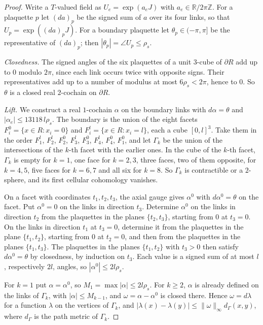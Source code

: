 \documentclass[11pt]{amsart}
\theoremstyle{definition}
\theoremstyle{remark}
\numberwithin{equation}{section}
\newcommand{\R}{\mathbb{R}}
\newcommand{\Z}{\mathbb{Z}}
\begin{document}
\begin{proof}
Write a $T$-valued field as $U_e=\exp(a_eJ)$ with $a_e\in\R/2\pi\Z$. For a
plaquette $p$ let $(da)_p$ be the signed sum of $a$ over its four links, so
that $U_p=\exp((da)_pJ)$. For a boundary plaquette let $\theta_p\in(-\pi,
\pi]$ be the representative of $(da)_p$; then $|\theta_p|=\angle U_p\le
\rho_s$.

\emph{Closedness.} The signed angles of the six plaquettes of a unit
$3$-cube of $\partial R$ add up to $0$ modulo $2\pi$, since each link occurs
twice with opposite signs. Their representatives add up to a number of
modulus at most $6\rho_s<2\pi$, hence to $0$. So $\theta$ is a closed real
$2$-cochain on $\partial R$.

\emph{Lift.} We construct a real $1$-cochain $\alpha$ on the boundary links
with $d\alpha=\theta$ and $|\alpha_e|\le13118\,l\rho_s$. The boundary is the
union of the eight facets $F_i^0=\{x\in R:x_i=0\}$ and $F_i^l=\{x\in R:x_i=
l\}$, each a cube $[0,l]^3$. Take them in the order $F_1^l$, $F_2^l$,
$F_2^0$, $F_3^l$, $F_3^0$, $F_4^l$, $F_4^0$, $F_1^0$, and let $\Gamma_k$ be
the union of the intersections of the $k$-th facet with the earlier ones.
In the cube of the $k$-th facet, $\Gamma_k$ is empty for $k=1$, one face for
$k=2,3$, three faces, two of them opposite, for $k=4,5$, five faces for
$k=6,7$ and all six for $k=8$. So $\Gamma_k$ is contractible or a
$2$-sphere, and its first cellular cohomology vanishes.

On a facet with coordinates $t_1,t_2,t_3$, the axial gauge gives
$\alpha^0$ with $d\alpha^0=\theta$ on the facet. Put $\alpha^0=0$ on the
links in direction $t_3$. Determine $\alpha^0$ on the links in direction
$t_2$ from the plaquettes in the planes $\{t_2,t_3\}$, starting from $0$ at
$t_3=0$. On the links in direction $t_1$ at $t_3=0$, determine it from the
plaquettes in the plane $\{t_1,t_2\}$, starting from $0$ at $t_2=0$, and
then from the plaquettes in the planes $\{t_1,t_3\}$. The plaquettes in the
planes $\{t_1,t_2\}$ with $t_3>0$ then satisfy $d\alpha^0=\theta$ by
closedness, by induction on $t_3$. Each value is a signed sum of at most
$l$, respectively $2l$, angles, so $|\alpha^0|\le2l\rho_s$.

For $k=1$ put $\alpha=\alpha^0$, so $M_1=\max|\alpha|\le2l\rho_s$. For
$k\ge2$, $\alpha$ is already defined on the links of $\Gamma_k$, with
$|\alpha|\le M_{k-1}$, and $\omega=\alpha-\alpha^0$ is closed there.
Hence $\omega=d\lambda$ for a function $\lambda$ on the vertices of
$\Gamma_k$, and $|\lambda(x)-\lambda(y)|\le\lVert\omega\rVert_\infty
d_\Gamma(x,y)$, where $d_\Gamma$ is the path metric of $\Gamma_k$.


\end{proof}
\end{document}
